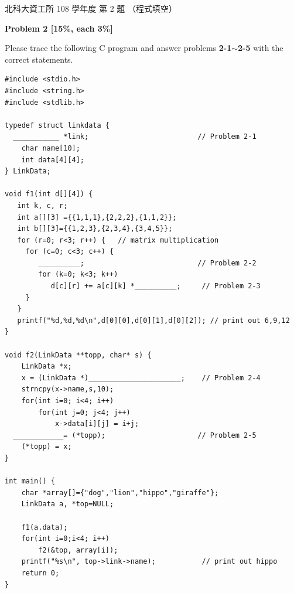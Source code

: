 \begin{pastexam}[label={px:ntut-108-prog-02}]{北科大資工所 108 學年度 第 2 題}
（程式填空）

\textbf{Problem 2 [15\%, each 3\%]}

Please trace the following C program and answer problems \textbf{2-1$\sim$2-5} with the correct
statements.
\begin{verbatim}
#include <stdio.h>
#include <string.h>
#include <stdlib.h>

typedef struct linkdata {
  ___________ *link;                          // Problem 2-1
    char name[10];
    int data[4][4];
} LinkData;

void f1(int d[][4]) {
   int k, c, r;
   int a[][3] ={{1,1,1},{2,2,2},{1,1,2}};
   int b[][3]={{1,2,3},{2,3,4},{3,4,5}};
   for (r=0; r<3; r++) {   // matrix multiplication
     for (c=0; c<3; c++) {
        __________;                           // Problem 2-2
        for (k=0; k<3; k++)
           d[c][r] += a[c][k] *__________;     // Problem 2-3
     }
   }
   printf("%d,%d,%d\n",d[0][0],d[0][1],d[0][2]); // print out 6,9,12
}

void f2(LinkData **topp, char* s) {
    LinkData *x;
    x = (LinkData *)______________________;    // Problem 2-4
    strncpy(x->name,s,10);
    for(int i=0; i<4; i++)
        for(int j=0; j<4; j++)
            x->data[i][j] = i+j;
  ____________= (*topp);                      // Problem 2-5
    (*topp) = x;
}

int main() {
    char *array[]={"dog","lion","hippo","giraffe"};
    LinkData a, *top=NULL;

    f1(a.data);
    for(int i=0;i<4; i++)
        f2(&top, array[i]);
    printf("%s\n", top->link->name);           // print out hippo
    return 0;
}
\end{verbatim}
\end{pastexam}

